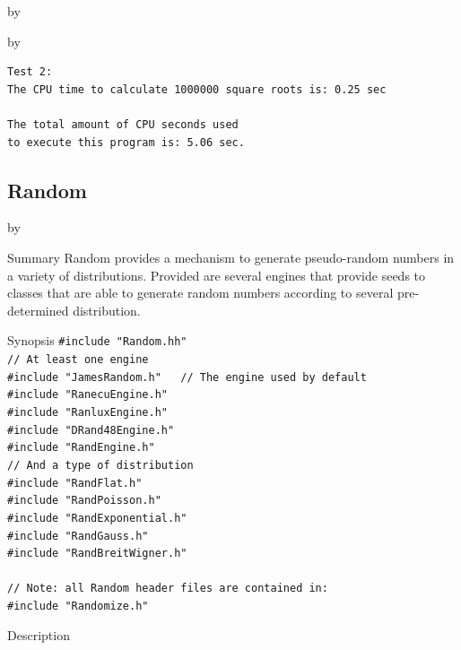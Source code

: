 \documentclass[twoside]{article}
\newcommand{\entrylabel}[1]{\mbox{\textbf{{#1}}}\hfil}%
\newenvironment{entry}
{\begin{list}{}%
    {\renewcommand{\makelabel}{\entrylabel}%
     \setlength{\labelwidth}{90pt}%
     \setlength{\leftmargin}{\labelwidth}
     \advance\leftmargin by \labelsep%
      }%
    }%
  {\end{list}}
\newcommand{\Entrylabel}[1]%
{\raisebox{0pt}[1ex][0pt]{\makebox[\labelwidth][l]%
    {\parbox[t]{\labelwidth}{\hspace{0pt}\textbf{{#1}}}}}}
\newenvironment{Entry}%
{\renewcommand{\entrylabel}{\Entrylabel}\begin{entry}}%
  {\end{entry}}
\begin{document}
\begin{description}
\begin{Entry}
\begin{Entry}
{\begin{verbatim}
Test 2:
The CPU time to calculate 1000000 square roots is: 0.25 sec

The total amount of CPU seconds used 
to execute this program is: 5.06 sec.
\end{verbatim}
}

\end{Entry}

\clearpage

%
%
\subsection{Random } \label{Random}
\begin{Entry}
\item[Summary]
    Random provides a mechanism to generate pseudo-random numbers in
    a variety of distributions.  Provided are several engines
    that provide seeds to classes that are able to generate random
    numbers according to several pre-determined distribution.
    
\item[Synopsis]
    \verb+#include "Random.hh"+\\
    \verb+// At least one engine+\\
    \verb+#include "JamesRandom.h"   // The engine used by default+\\
    \verb+#include "RanecuEngine.h"+\\
    \verb+#include "RanluxEngine.h"+\\
    \verb+#include "DRand48Engine.h"+\\
    \verb+#include "RandEngine.h"+\\
    \verb+// And a type of distribution+\\
    \verb+#include "RandFlat.h"+\\
    \verb+#include "RandPoisson.h"+\\
    \verb+#include "RandExponential.h"+\\
    \verb+#include "RandGauss.h"+\\
    \verb+#include "RandBreitWigner.h"+\\ \\
    \verb+// Note: all Random header files are contained in:+\\
    \verb+#include "Randomize.h"+\\
    
\item[Description]   


\end{Entry}
\end{Entry}
\end{description}
\end{document}
